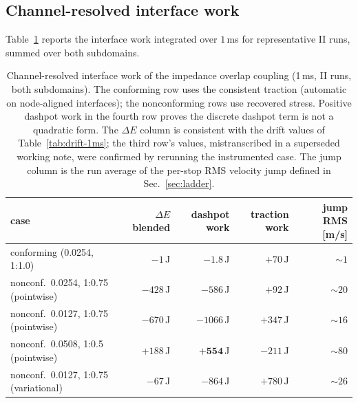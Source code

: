 \documentclass[11pt]{article}
\begin{document}
\subsection{Channel-resolved interface work}
\label{sec:channels}

Table~\ref{tab:channel-work} reports the interface work integrated over
$1$\,ms for representative II runs, summed over both subdomains.

\begin{table}[htbp]
\centering
\caption{Channel-resolved interface work of the impedance overlap coupling
(1\,ms, II runs, both subdomains). The conforming row uses the consistent
traction (automatic on node-aligned interfaces); the nonconforming rows
use recovered stress. Positive dashpot work in the fourth row proves the
discrete dashpot term is not a quadratic form. The $\Delta E$ column is
consistent with the drift values of Table~\ref{tab:drift-1ms}; the third
row's values, mistranscribed in a superseded working note, were confirmed
by rerunning the instrumented case. The jump column is the run average of
the per-stop RMS velocity jump defined in Sec.~\ref{sec:ladder}.}
\label{tab:channel-work}
\small
\begin{tabular}{lrrrr}
\toprule
case & $\Delta E$ blended & dashpot work & traction work & jump RMS [m/s] \\
\midrule
conforming (0.0254, 1:1.0)          & $-1$\,J    & $-1.8$\,J  & $+70$\,J  & $\sim 1$ \\
nonconf.\ 0.0254, 1:0.75 (pointwise) & $-428$\,J  & $-586$\,J  & $+92$\,J  & $\sim 20$ \\
nonconf.\ 0.0127, 1:0.75 (pointwise) & $-670$\,J & $-1066$\,J & $+347$\,J & $\sim 16$ \\
nonconf.\ 0.0508, 1:0.5 (pointwise) & $+188$\,J  & $\mathbf{+554}$\,J & $-211$\,J & $\sim 80$ \\
nonconf.\ 0.0127, 1:0.75 (variational) & $-67$\,J & $-864$\,J & $+780$\,J & $\sim 26$ \\
\bottomrule
\end{tabular}
\end{table}
\end{document}
